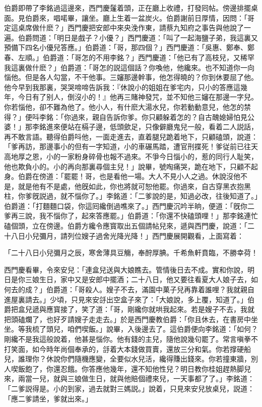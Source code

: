 伯爵即帶了李銘過這邊來，西門慶鬔着頭，正在廳上收禮，打發囘帖。傍邊排擺桌面。見伯爵來，唱喏畢，讓坐。廳上生着一盆炭火。伯爵謝前日厚情，因問：「哥定這桌席做什麽？」西門慶把安郎中來央浼作東，請蔡九知府之事告與他說了一遍。伯爵問道：「明日是戲子？小優？」西門慶道：「叫了一起海鹽子弟，我這裏又預備下四名小優兒答應。」伯爵道：「哥，那四個？」西門慶道：「吳惠、鄭奉、鄭春、左順。」伯爵道：「哥怎的不用李銘？」西門慶道：「他已有了高枝兒，又稀罕我這裏做什麽？」伯爵道：「哥怎的説這個話？你喚他，他纔來。也不知道你一向惱他。但是各人勾當，不干他事。三嬸那邊幹事，他怎得曉的？你到休要屈了他。他今早到我那裏，哭哭啼啼告訴我：『休說小的姐姐在爹宅内，只小的答應這幾年，今日有了别人，倒沒小的！』他再三賭神發咒，並不知他三嬸在那邊一字兒。你若惱他，卻不難為他了。他小人，有什麽大湯水兒，你若動動意兒，他怎的禁得？」便呌李銘：「你過來，親自告訴你爹。你只顧躲着怎的？自古醜媳婦怕見公婆！」那李銘進來便站在槅子邊，低頭歛足，只像僻廳鬼兒一般，看着二人説話，再不敢言語。聽得伯爵呌他，一面走進去，直着腿兒跪着地下，只顧磕頭，說道：「爹再訪，那邊事小的但有一字知道，小的車碾馬踏，遭官刑揲死！爹従前已往天高地厚之恩，小的一家粉身碎骨也報不過來。不爭今日惱小的，惹的同行人耻笑，他也欺負小的。小的再向那裏尋個主兒！」說畢，號啕痛哭，跪在地下，只顧不起身。伯爵在傍道：「罷罷！哥，也是看他一場。大人不見小人之過。休說沒他不是，就是他有不是處，他旣如此，你也將就可恕他罷。你過來，自古穿黑衣抱黑柱，你爹旣説過，就不惱你了。」李銘道：「二爹說的是，知過必改，往後知道了。」伯爵道：「打麵麵口袋，你這囘纔倒過噍來了。」西門慶沉吟半晌，便道：「旣你二爹再三說，我不惱你了，起來答應罷。」伯爵道：「你還不快磕頭哩！」那李銘連忙磕個頭，立在傍邊。伯爵方纔令應寳取出五個請帖兒來，遞與西門慶，說道：「二十八日小兒彌月，請列位嫂子過舍光降光降！」西門慶展開觀看，上面寫着：

\begin{myquote}[\markfont]
「二十八日小兒彌月之辰，寒舍薄具豆觴，奉酧厚腆。千希魚軒賁臨，不勝幸荷！

\end{myquote}

西門慶看畢，令來安兒：「連盒兒送與大娘瞧去。管情後日去不成。實和你說，明日是你三娘生日，家中又是安郎中擺酒；二十八日，他又要往看夏大人娘子去，如何去的成？」伯爵道：「哥殺人。嫂子不去，滿園中菓子兒再靠着誰哩？我就親自進屋裏請去。」少頃，只見來安㧱出空盒子來了：「大娘說，多上覆，知道了。」伯爵把盒兒遞與應寳接了，笑了道：「哥，剛纔你就哄我起來。若是嫂子不去，我就把頭磕爛了，也好歹請嫂子走走去。」於是西門慶教伯爵：「你且休去，在書房中坐坐。等我梳了頭兒，咱們喫飯。」說畢，入後邊去了。這伯爵便向李銘道：「如何？剛纔不是我這般說着，他甚是惱你。他有錢的主兒，隨他說幾句罷了。常言嗔拳不打笑面，如今時年尚個奉承的，㧱着大本錢做買賣，還放三分和氣。你若撑硬船兒，誰理你？休說你們隨機應變，全要似水兒活，纔得賺出錢來。你若撞東牆，別人喫飯飽了，你還忍餓。你答應他幾年，還不知他性兒？明日教你桂姐趕熱脚兒來，兩當一兒，就與三娘做生日，就與他賠個禮來兒，一天事都了了。」李銘道：「二爹説得是。小的到家，過去就對三媽説。」說着，只見來安兒放桌兒，説道：「應二爹請坐，爹就出來。」

